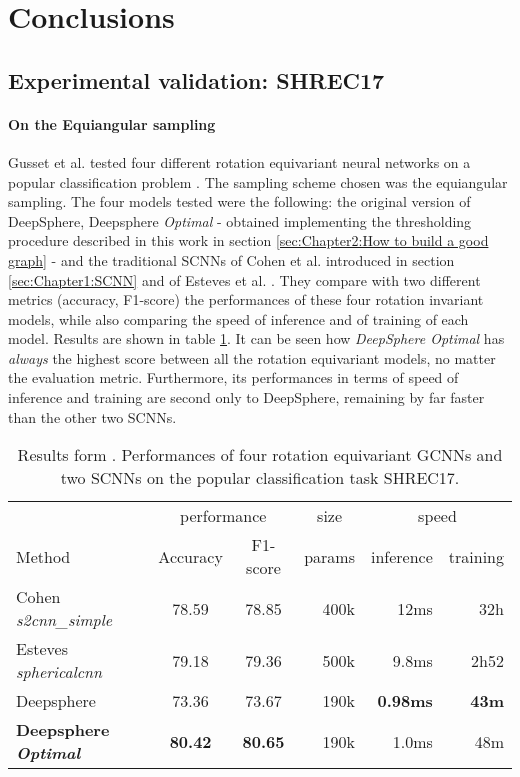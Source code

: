 

\section{Conclusions}\label{sec:Chapter4}




\subsection{Experimental validation: SHREC17}
\label{sec:Chapter5:Experimental validation}
\paragraph{On the Equiangular sampling}Gusset et al. \cite{Gusset} tested four different rotation equivariant neural networks on a popular classification problem \cite{SHREC17}. The sampling scheme chosen was the equiangular sampling. The four models tested were the following: the original version of DeepSphere, Deepsphere \textit{Optimal} - obtained implementing the thresholding procedure described in this work in section \ref{sec:Chapter2:How to build a good graph} - and the traditional SCNNs of Cohen et al. \cite{SCNN} introduced in section \ref{sec:Chapter1:SCNN} and of Esteves et al. \cite{Esteves}. They compare with two different metrics  (accuracy, F1-score) the performances of these four rotation invariant models, while also comparing the speed of inference and of training of each model. Results are shown in table \ref{tab:SHREC17_class}.  It can be seen how \textit{DeepSphere Optimal} has \textit{always} the highest score between all the rotation equivariant models, no matter the evaluation metric. Furthermore, its performances in terms of speed of inference and training are second only to DeepSphere, remaining by far faster than the other two SCNNs. 
\begin{table}[ht]
	\centering
	\begin{tabular}{l|c c r r r}
		\multicolumn{1}{l}{} & \multicolumn{2}{c}{performance} & \multicolumn{1}{c}{size} & \multicolumn{2}{c}{speed}\\
		\cmidrule(lr){2-3} \cmidrule(lr){4-4} \cmidrule(lr){5-6}
		\multicolumn{1}{l}{Method} & Accuracy & F1-score & params & inference & training \\ \hline
		Cohen \emph{s2cnn\_simple} & 78.59 & 78.85 & 400k & 12ms & 32h\\
		Esteves \emph{sphericalcnn} & 79.18 & 79.36 & 500k & 9.8ms & 2h52\\ \hline
		Deepsphere & 73.36 & 73.67 & 190k & \textbf{0.98ms} & \textbf{43m} \\
		\textbf{Deepsphere \emph{Optimal}} & \textbf{80.42} & \textbf{80.65} & 190k & 1.0ms & 48m
	\end{tabular}
	\caption{Results form \cite{Gusset}. Performances of four rotation equivariant GCNNs and two SCNNs on the popular classification task SHREC17.}
	\label{tab:SHREC17_class}
\end{table}
